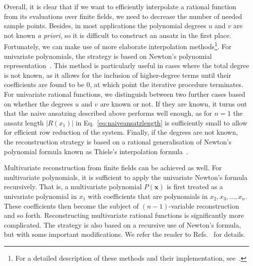 \documentclass[main.tex]{subfiles}
\begin{document}
Overall, it is clear that if we want to efficiently interpolate a rational function from its evaluations over finite fields, we need to decrease the number of needed sample points. Besides, in most applications the polynomial degrees $u$ and $v$ are not known \textit{a priori}, so it is difficult to construct an ansatz in the first place. Fortunately, we can make use of more elaborate interpolation methods\footnote{For a detailed description of these methods and their implementation, see~\cite{Peraro:2016wsq}.}. For univariate polynomials, the strategy is based on Newton's polynomial representation~\cite{Abramowitz1965HandbookOM}. This method is particularly useful in cases where the total degree is not known, as it allows for the inclusion of higher-degree terms until their coefficients are found to be 0, at which point the iterative procedure terminates. For univariate rational functions, we distinguish between two further cases based on whether the degrees $u$ and $v$ are known or not. If they are known, it turns out that the naive ansatzing described above performs well enough, as for $n=1$ the ansatz length $|R(x_1)|$ in Eq.~\ref{eq:naiveansatzlength} is sufficiently small to allow for efficient row reduction of the system. Finally, if the degrees are not known, the reconstruction strategy is based on a rational generalisation of Newton's  polynomial formula known as Thiele's interpolation formula~\cite{Abramowitz1965HandbookOM}. 

Multivariate reconstruction from finite fields can be achieved as well. For multivariate polynomials, it is sufficient to apply the univariate Newton's formula recursively. That is, a multivariate polynomial $P(\mathbf{x})$ is first treated as a univariate polynomial in $x_1$ with coefficients that are polynomials in $x_2, x_3, \ldots, x_n$. These coefficients then become the subject of $(n-1)$-variable reconstruction and so forth. Reconstructing multivariate rational functions is significantly more complicated. The strategy is also based on a recursive use of Newton's formula, but with some important modifications. We refer the reader to Refs.~\cite{CUYT20111445, Peraro:2016wsq} for details.
\end{document}
